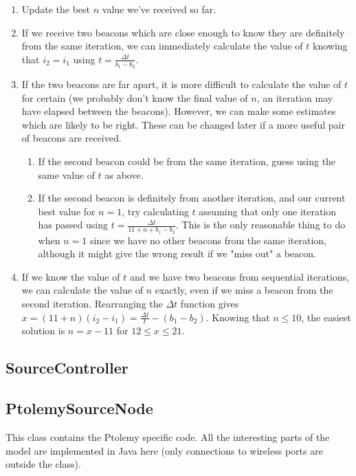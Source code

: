 \documentclass[a4paper,12pt,draft,DIV=calc]{scrartcl}
\begin{document}
\begin{enumerate}
  \item Update the best $n$ value we've received so far.
  \item If we receive two beacons which are close enough to know they are
    definitely from the same iteration, we can immediately calculate the value
		of $t$ knowing that $i_2 = i_1$ using $t = \frac{\Delta t}{b_1 - b_2}$.
	\item If the two beacons are far apart, it is more difficult to calculate the
		value of $t$ for certain (we probably don't know the final value of $n$,
		an iteration may have elapsed between the beacons). However, we can make
		some estimates which are likely to be right. These can be changed later if
		a more useful pair of beacons are received.
		\begin{enumerate}
			\item If the second beacon could be from the same iteration, guess
				using the same value of $t$ as above.
			\item If the second beacon is definitely from another iteration, and our
				current best value for $n = 1$, try calculating $t$ assuming that only
				one iteration has passed using $t = \frac{\Delta t}{11 + n + b_1 -
				b_2}$. This is the only reasonable thing to do when $n = 1$ since we
				have no other beacons from the same iteration, although it might give
				the wrong result if we "miss out" a beacon.
		\end{enumerate}
	\item If we know the value of $t$ and we have two beacons from sequential
		iterations, we can calculate the value of $n$ exactly, even if we miss a
		beacon from the second iteration. Rearranging the $\Delta t$ function gives
		$x = (11 + n)(i_2 - i_1) = \frac{\Delta	t}{t} - (b_1 - b_2)$. Knowing that
		$n \leq 10$, the easiest solution is $n = x - 11$ for $12 \leq x \leq 21$.
\end{enumerate}


\subsection{SourceController}


\subsection{PtolemySourceNode}
This class contains the Ptolemy specific code. All the interesting parts of the
model are implemented in Java here (only connections to wireless ports are
outside the class).
\end{document}
